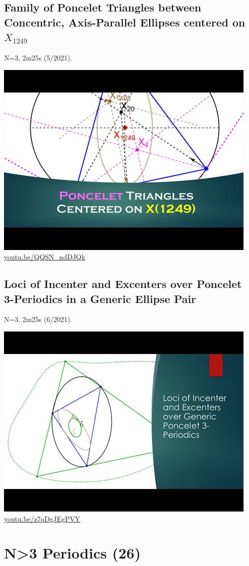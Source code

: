 \documentclass[12pt]{amsart}
\begin{document}
\subsection{Family of Poncelet Triangles between Concentric, Axis-Parallel Ellipses centered on $X_{1249}$}
\label{vid:QQSN_ndDJQk}
\noindent N=3, 2m25s (5/2021). 
\begin{center}\includegraphics[width=.5\textwidth]{pics/QQSN_ndDJQk.jpg} \\ 
\href{https://youtu.be/QQSN_ndDJQk}{\url{youtu.be/QQSN\_ndDJQk}}\end{center}
% 

\subsection{Loci of Incenter and Excenters over Poncelet 3-Periodics in a Generic Ellipse Pair}
\label{vid:z7qDgJEgPVY}
\noindent N=3, 2m25s (6/2021). 
\begin{center}\includegraphics[width=.5\textwidth]{pics/z7qDgJEgPVY.jpg} \\ 
\href{https://youtu.be/z7qDgJEgPVY}{\url{youtu.be/z7qDgJEgPVY}}\end{center}
% 


\section{N>3 Periodics (26)}
\end{document}
